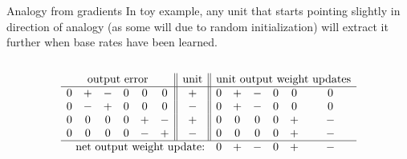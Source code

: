 \documentclass{beamer}
\begin{document}
\appendix
\begin{frame}{Analogy from gradients}
In toy example, any unit that starts pointing slightly in direction of analogy (as some will due to random initialization) will extract it further when base rates have been learned.\\[11pt]
\begin{columns}
\end{columns} 
{ 
\[
\begin{array}{cccccc||c||cccccc} 
\multicolumn{6}{c||}{\text{output error}}  & \text{unit}  & \multicolumn{6}{c}{\text{unit output weight updates}} \\
\hline
 0 & + & - & 0 & 0 & 0  &   +    &  0 & + & - & 0 & 0 & 0   \\
0 & - & + & 0 & 0 & 0  &   -  & 0 & + & - & 0 & 0 & 0   \\
 0 & 0 & 0 & 0 & + & - &   +   &  0 & 0 & 0 & 0 & + & - \\
 0 & 0 & 0 & 0 & - & +  &  - &  0 & 0 & 0 & 0 & + & - \\
\hline
\multicolumn{7}{r}{\text{net output weight update:}} &   0 & + & - & 0 & + & - \\
\end{array} 
\]
}
\end{frame}
\end{document}
